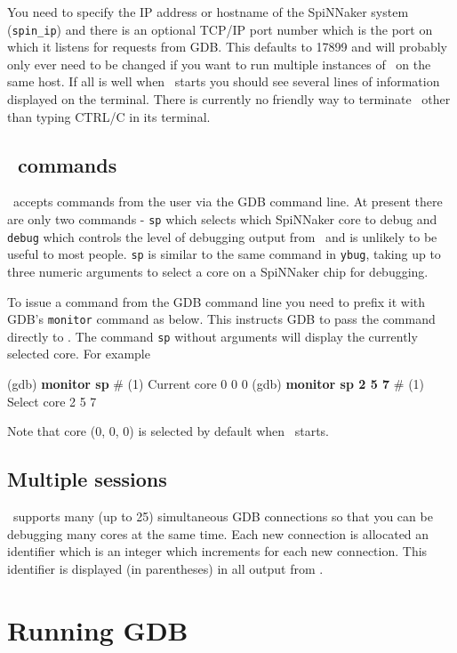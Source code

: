 You need to specify the IP address or hostname of the SpiNNaker system
(\texttt{spin\_ip}) and there is an optional TCP/IP port number which
is the port on which it listens for requests from GDB. This defaults
to 17899 and will probably only ever need to be changed if you want to
run multiple instances of \gdbspin\ on the same host. If all is well
when \gdbspin\ starts you should see several lines of information
displayed on the terminal. There is currently no friendly way to
terminate \gdbspin\ other than typing CTRL/C in its terminal.

\subsection{\gdbspin\ commands}

\gdbspin\ accepts commands from the user via the GDB command
line. At present there are only two commands -
\texttt{sp} which selects which SpiNNaker core to debug and
\texttt{debug} which controls the level of debugging output from
\gdbspin\ and is unlikely to be useful to most people.
\texttt{sp} is similar to the same command in \texttt{ybug}, taking
up to three numeric arguments to select a core on a SpiNNaker chip
for debugging.

To issue a command from the GDB command line you need to prefix it
with GDB's \texttt{monitor} command as below. This instructs GDB to
pass the command directly to \gdbspin. The command \texttt{sp} without
arguments will display the currently selected core. For example

\begin{shell}
(gdb) \textbf{monitor sp}
#  (1) Current core 0 0 0
(gdb) \textbf{monitor sp 2 5 7}
#  (1) Select core 2 5 7
\end{shell}

Note that core (0, 0, 0) is selected by default when \gdbspin\
starts.

\subsection{Multiple sessions}

\gdbspin\ supports many (up to 25) simultaneous GDB connections
so that you can be debugging many cores at the same time. Each new
connection is allocated an identifier which is an integer which
increments for each new connection. This identifier is displayed
(in parentheses) in all output from \gdbspin.

\section{Running GDB}

